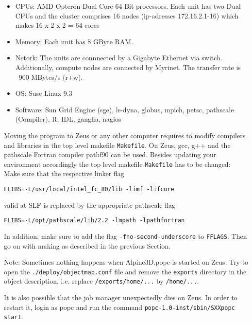 \documentclass[12pt]{report}
\begin{document}
\begin{itemize}
\item CPUs: AMD Opteron Dual Core 64 Bit processors. Each unit has two
  Dual CPUs and the cluster comprises 16 nodes (ip-adresses
  172.16.2.1-16) which makes 16 x 2 x 2 = 64 cores

\item Memory:
   Each unit has 8 GByte RAM.

 \item Netork: The units are connnected by a Gigabyte Ethernet via
   switch. Additionally, compute nodes are connected by Myrinet.
   The transfer rate is ~900 MBytes/s (r+w).

 \item OS:
   Suse Linux 9.3

 \item Software: Sun Grid Engine (sge), ls-dyna, globus, mpich, petsc,
   pathscale (Compiler), R, IDL, ganglia, nagios
\end{itemize}

Moving the program to Zeus or any other computer requires to modify
compilers and libraries in the top level makefile \verb+Makefile+. On
Zeus, gcc, g++ and the pathscale Fortran compiler pathf90 can be used.
Besides updating your environment accordingly the top level makefile
\verb+Makefile+ has to be changed: Make sure that the respective
linker flag
\begin{verbatim}
FLIBS=-L/usr/local/intel_fc_80/lib -limf -lifcore
\end{verbatim}
valid at SLF is replaced by the appropriate pathscale flag
\begin{verbatim}
FLIBS=-L/opt/pathscale/lib/2.2 -lmpath -lpathfortran
\end{verbatim}
In addition, make sure to add the flag \verb+-fno-second-underscore+
to \verb+FFLAGS+. Then go on with making as described in the previous
Section.

Note: Sometimes nothing happens when Alpine3D.popc is started on
Zeus. Try to open the \verb+./deploy/objectmap.conf+ file and remove
the \verb+exports+ directory in the object description, i.e. replace
\verb+/exports/home/...+ by \verb+/home/...+.

It is also possible that the job manager unexpectedly dies on Zeus. In
order to restart it, login as popc and run the command
\verb+popc-1.0-inst/sbin/SXXpopc start+.

\end{document}
